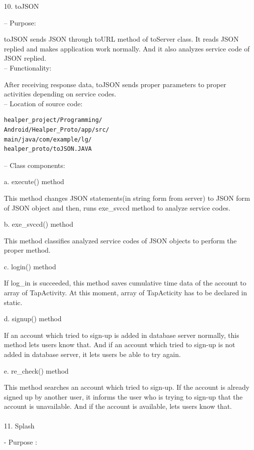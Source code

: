 \documentclass[conference]{IEEEtran}
\begin{document}
10. toJSON

 -- Purpose: 

toJSON sends JSON through toURL method of toServer class. It reads JSON replied and makes application work normally. And it also analyzes service code of JSON replied.\\

 -- Functionality: 

After receiving response data, toJSON sends proper parameters to proper activities depending on service codes.\\

 -- Location of source code: 

\begin{verbatim}
healper_project/Programming/
Android/Healper_Proto/app/src/
main/java/com/example/lg/
healper_proto/toJSON.JAVA
\end{verbatim}

 -- Class components:

a. execute() method
	
This method changes JSON statements(in string form from server) to JSON form of JSON object and then, runs exe\_{}svccd method to analyze service codes.
	
b. exe\_{}svccd() method
	
This method classifies analyzed service codes of JSON objects to perform the proper method.
	
c. login() method
	
If log\_{}in is succeeded, this method saves cumulative time data of the account to array of TapActivity. At this moment, array of TapActicity has to be declared in static.
	
d. signup() method
	
If an account which tried to sign-up is added in database server normally, this method lets users know that. And if an account which tried to sign-up is not added in database server, it lets users be able to try again.
	
e. re\_{}check() method

This method searches an account which tried to sign-up. If the account is already signed up by another user, it informs the user who is trying to sign-up that the account is unavailable. And if the account is available, lets users know that.\\\\

11. Splash

- Purpose : 
\end{document}
